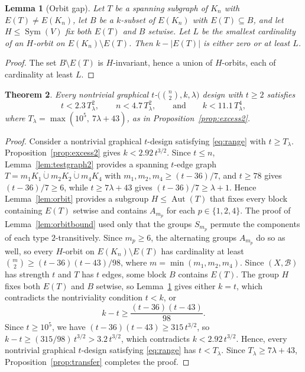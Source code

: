\documentclass[12pt]{amsart}
\newtheorem{theorem}{Theorem}[section]
\newtheorem{lemma}[theorem]{Lemma}
\theoremstyle{definition}
\DeclareMathOperator{\Sym}{Sym}
\DeclareMathOperator{\Aut}{Aut}
\newcommand{\dcup}{\mathbin{\dot\cup}}
\newcommand{\cB}{\mathcal{B}}
\begin{document}
\begin{lemma}[Orbit gap]
\label{lem:gap}
Let $T$ be a spanning subgraph of $K_n$ with $E(T) \neq E(K_n)$, let $B$ be
a $k$-subset of $E(K_n)$ with $E(T) \subseteq B$, and let $H \leq \Sym(V)$
fix both $E(T)$ and $B$ setwise. Let $L$ be the smallest cardinality of an
$H$-orbit on $E(K_n) \setminus E(T)$. Then $k - |E(T)|$ is either zero or at
least $L$.
\end{lemma}

\begin{proof}
The set $B \setminus E(T)$ is $H$-invariant, hence a union of $H$-orbits,
each of cardinality at least $L$.
\end{proof}

\begin{theorem}
\label{thm:explicit}
Every nontrivial graphical $t$-$\bigl(\binom{n}{2}, k, \lambda\bigr)$ design
with $t \geq 2$ satisfies
\[
t < 2.3\, T_\lambda^2,
\qquad
n < 4.7\, T_\lambda^2,
\qquad \text{and} \qquad
k < 11.1\, T_\lambda^4,
\]
where $T_\lambda = \max(10^5,\ 7\lambda + 43)$, as in
Proposition~\ref{prop:excess2}.
\end{theorem}

\begin{proof}
Consider a nontrivial graphical $t$-design satisfying \eqref{eq:range} with
$t \geq T_\lambda$. Proposition~\ref{prop:excess2} gives $k < 2.92\,
t^{3/2}$. Since $t \leq n$, Lemma~\ref{lem:testgraph2} provides a spanning
$t$-edge graph $T = m_1 K_1 \dcup m_2 K_2 \dcup m_4 K_4$ with $m_1, m_2, m_4
\geq (t - 36)/7$, and $t \geq 78$ gives $(t - 36)/7 \geq 6$, while $t \geq
7\lambda + 43$ gives $(t - 36)/7 \geq \lambda + 1$. Hence
Lemma~\ref{lem:orbit} provides a subgroup $H \leq \Aut(T)$ that fixes every
block containing $E(T)$ setwise and contains $A_{m_p}$ for each $p \in \{1,
2, 4\}$. The proof of Lemma~\ref{lem:orbitbound} used only that the groups
$S_{m_p}$ permute the components of each type $2$-transitively. Since $m_p
\geq 6$, the alternating groups $A_{m_p}$ do so as well, so every $H$-orbit
on $E(K_n) \setminus E(T)$ has cardinality at least $\binom{m}{2} \geq (t -
36)(t - 43)/98$, where $m = \min(m_1, m_2, m_4)$. Since $(X, \cB)$ has
strength $t$ and $T$ has $t$ edges, some block $B$ contains $E(T)$. The
group $H$ fixes both $E(T)$ and $B$ setwise, so Lemma~\ref{lem:gap} gives
either $k = t$, which contradicts the nontriviality condition $t < k$, or
\[
k - t \geq \frac{(t - 36)(t - 43)}{98}.
\]
Since $t \geq 10^5$, we have $(t - 36)(t - 43) \geq 315\, t^{3/2}$, so $k -
t \geq (315/98)\, t^{3/2} > 3.2\, t^{3/2}$, which contradicts $k < 2.92\,
t^{3/2}$. Hence, every nontrivial graphical $t$-design satisfying
\eqref{eq:range} has $t < T_\lambda$. Since $T_\lambda \geq 7\lambda + 43$,
Proposition~\ref{prop:transfer} completes the proof.
\end{proof}
\end{document}
